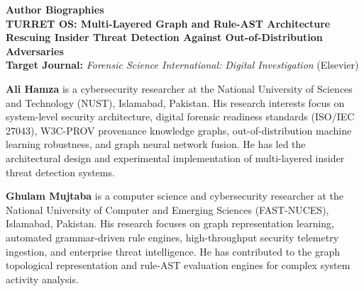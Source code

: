 \documentclass[11pt,a4paper]{article}
\begin{document}
\begin{center}
    {\Large \textbf{Author Biographies}} \\[1.2em]
    \textbf{TURRET OS: Multi-Layered Graph and Rule-AST Architecture Rescuing Insider Threat Detection Against Out-of-Distribution Adversaries} \\[1em]
    \textbf{Target Journal:} \textit{Forensic Science International: Digital Investigation} (Elsevier)
\end{center}

\vspace{1.5em}

\textbf{Ali Hamza} is a cybersecurity researcher at the National University of Sciences and Technology (NUST), Islamabad, Pakistan. His research interests focus on system-level security architecture, digital forensic readiness standards (ISO/IEC 27043), W3C-PROV provenance knowledge graphs, out-of-distribution machine learning robustness, and graph neural network fusion. He has led the architectural design and experimental implementation of multi-layered insider threat detection systems.

\vspace{1.5em}

\textbf{Ghulam Mujtaba} is a computer science and cybersecurity researcher at the National University of Computer and Emerging Sciences (FAST-NUCES), Islamabad, Pakistan. His research focuses on graph representation learning, automated grammar-driven rule engines, high-throughput security telemetry ingestion, and enterprise threat intelligence. He has contributed to the graph topological representation and rule-AST evaluation engines for complex system activity analysis.
\end{document}
